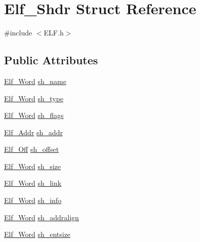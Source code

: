 \hypertarget{struct_elf___shdr}{\section{Elf\+\_\+\+Shdr Struct Reference}
\label{struct_elf___shdr}
}


{\ttfamily \#include $<$E\+L\+F.\+h$>$}

\subsection*{Public Attributes}
\begin{DoxyCompactItemize}
\item 
\hyperlink{_e_l_f_8h_a497c5f6b52d8b0a104779c9e0c2da019}{Elf\+\_\+\+Word} \hyperlink{struct_elf___shdr_a4f628f4a31a0d3b65b1333707ec7a41e}{sh\+\_\+name}
\item 
\hyperlink{_e_l_f_8h_a497c5f6b52d8b0a104779c9e0c2da019}{Elf\+\_\+\+Word} \hyperlink{struct_elf___shdr_afc12886fbfa0ea8fc0fde5d1dbf706bb}{sh\+\_\+type}
\item 
\hyperlink{_e_l_f_8h_a497c5f6b52d8b0a104779c9e0c2da019}{Elf\+\_\+\+Word} \hyperlink{struct_elf___shdr_a9918ef6292b347509932bc834811c6dc}{sh\+\_\+flags}
\item 
\hyperlink{_e_l_f_8h_a83694be97fb890d1883ac3c680ca523d}{Elf\+\_\+\+Addr} \hyperlink{struct_elf___shdr_a826352a4993890b47567434a06f16c76}{sh\+\_\+addr}
\item 
\hyperlink{_e_l_f_8h_a09549f5ac4e10f52b46f6dba8d8623bd}{Elf\+\_\+\+Off} \hyperlink{struct_elf___shdr_a477af45ae125aabc9004bc22cca9f359}{sh\+\_\+offset}
\item 
\hyperlink{_e_l_f_8h_a497c5f6b52d8b0a104779c9e0c2da019}{Elf\+\_\+\+Word} \hyperlink{struct_elf___shdr_ab91fe55a6d4d7dfdda120357ba718924}{sh\+\_\+size}
\item 
\hyperlink{_e_l_f_8h_a497c5f6b52d8b0a104779c9e0c2da019}{Elf\+\_\+\+Word} \hyperlink{struct_elf___shdr_a15bcce9ee8927454d8051bd6cd1f6d6c}{sh\+\_\+link}
\item 
\hyperlink{_e_l_f_8h_a497c5f6b52d8b0a104779c9e0c2da019}{Elf\+\_\+\+Word} \hyperlink{struct_elf___shdr_a3714dde78b35f48bfb51595683a61173}{sh\+\_\+info}
\item 
\hyperlink{_e_l_f_8h_a497c5f6b52d8b0a104779c9e0c2da019}{Elf\+\_\+\+Word} \hyperlink{struct_elf___shdr_a7bb165f0fd6c081eada5e98d8035035b}{sh\+\_\+addralign}
\item 
\hyperlink{_e_l_f_8h_a497c5f6b52d8b0a104779c9e0c2da019}{Elf\+\_\+\+Word} \hyperlink{struct_elf___shdr_ad272d1a6e6c10a6c42413dd2d81f21fd}{sh\+\_\+entsize}
\end{DoxyCompactItemize}



